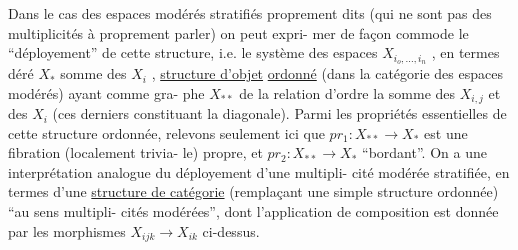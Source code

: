 
Dans le cas des espaces modérés stratifiés proprement dits (qui
ne sont pas des multiplicités à proprement parler) on peut expri-%
mer de façon commode le ``déployement'' de cette structure, i.e.
le système des espaces $X_{i_o,\ldots,i_n}$ , en termes déré $X_*$ somme des $X_i$ ,  \uline{structure d'objet}
\uline{ordonné} (dans la catégorie des espaces modérés) ayant comme gra-%
phe $X_{**}$ de la relation d'ordre la somme des $X_{i,j}$ et des $X_i$
(ces derniers constituant la diagonale). Parmi les propriétés
essentielles de cette structure ordonnée, relevons seulement
ici que $pr_1 : X_{**} \longrightarrow X_*$ est une fibration (localement trivia-%
le) propre, et $pr_2 : X_{**} \longrightarrow X_*$  ``bordant''.
On a une interprétation analogue du déployement d'une multipli-%
cité modérée stratifiée, en termes d'une \uline{structure de catégorie}
(remplaçant une simple structure ordonnée) ``au sens multipli-%
cités modérées'', dont l'application de composition est donnée
par les morphismes $X_{ijk} \longrightarrow X_{ik}$ ci-dessus.

